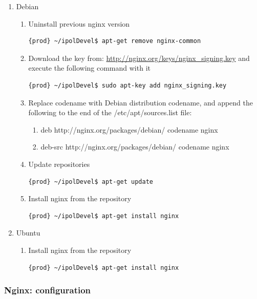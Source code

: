 \begin{enumerate}
\item Debian

\begin{enumerate}
\item Uninstall previous nginx version
\begin{lstlisting}[language=Bash]
{prod} ~/ipolDevel$ apt-get remove nginx-common
\end{lstlisting}

\item Download the key from: \url{http://nginx.org/keys/nginx_signing.key} and execute the following command with it
\begin{lstlisting}[language=Bash]
{prod} ~/ipolDevel$ sudo apt-key add nginx_signing.key
\end{lstlisting}

\item Replace codename with Debian distribution codename, and append the following to the end of the /etc/apt/sources.list file:
\begin{enumerate}
\item deb http://nginx.org/packages/debian/ codename nginx
\item deb-src http://nginx.org/packages/debian/ codename nginx
\end{enumerate}

\item Update repositories
\begin{lstlisting}[language=Bash]
{prod} ~/ipolDevel$ apt-get update
\end{lstlisting}

\item Install nginx from the repository
\begin{lstlisting}[language=Bash]
{prod} ~/ipolDevel$ apt-get install nginx
\end{lstlisting}

\end{enumerate}
\item Ubuntu
\begin{enumerate}
\item Install nginx from the repository
\begin{lstlisting}[language=Bash]
{prod} ~/ipolDevel$ apt-get install nginx
\end{lstlisting}
\end{enumerate}
\end{enumerate}

\subsubsection{Nginx: configuration}

